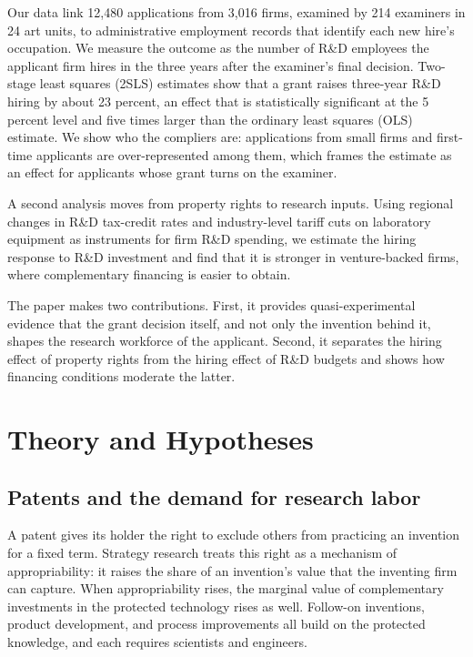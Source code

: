 \documentclass[11pt]{article}
\begin{document}
Our data link 12,480 applications from 3,016 firms, examined by 214 examiners in 24 art units, to administrative employment records that identify each new hire's occupation. We measure the outcome as the number of R\&D employees the applicant firm hires in the three years after the examiner's final decision. Two-stage least squares (2SLS) estimates show that a grant raises three-year R\&D hiring by about 23 percent, an effect that is statistically significant at the 5 percent level and five times larger than the ordinary least squares (OLS) estimate. We show who the compliers are: applications from small firms and first-time applicants are over-represented among them, which frames the estimate as an effect for applicants whose grant turns on the examiner.

A second analysis moves from property rights to research inputs. Using regional changes in R\&D tax-credit rates and industry-level tariff cuts on laboratory equipment as instruments for firm R\&D spending, we estimate the hiring response to R\&D investment and find that it is stronger in venture-backed firms, where complementary financing is easier to obtain.

The paper makes two contributions. First, it provides quasi-experimental evidence that the grant decision itself, and not only the invention behind it, shapes the research workforce of the applicant. Second, it separates the hiring effect of property rights from the hiring effect of R\&D budgets and shows how financing conditions moderate the latter.

\section{Theory and Hypotheses}

\subsection{Patents and the demand for research labor}

A patent gives its holder the right to exclude others from practicing an invention for a fixed term. Strategy research treats this right as a mechanism of appropriability: it raises the share of an invention's value that the inventing firm can capture. When appropriability rises, the marginal value of complementary investments in the protected technology rises as well. Follow-on inventions, product development, and process improvements all build on the protected knowledge, and each requires scientists and engineers.
\end{document}
